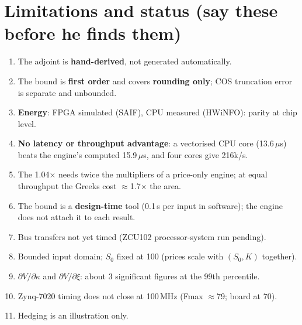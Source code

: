\documentclass[11pt,a4paper]{article}
\begin{document}
\section{Limitations and status (say these before he finds them)}
\begin{enumerate}
\item The adjoint is \textbf{hand-derived}, not generated automatically.
\item The bound is \textbf{first order} and covers \textbf{rounding only}; COS truncation error is separate and unbounded.
\item \textbf{Energy}: FPGA simulated (SAIF), CPU measured (HWiNFO): parity at chip level.
\item \textbf{No latency or throughput advantage}: a vectorised CPU core (13.6\,$\mu$s) beats the engine's computed 15.9\,$\mu$s, and four cores give 216k/s.
\item The 1.04$\times$ needs twice the multipliers of a price-only engine; at equal throughput the Greeks cost $\approx$1.7$\times$ the area.
\item The bound is a \textbf{design-time} tool (0.1\,s per input in software); the engine does not attach it to each result.
\item Bus transfers not yet timed (ZCU102 processor-system run pending).
\item Bounded input domain; $S_0$ fixed at 100 (prices scale with $(S_0,K)$ together).
\item $\partial V/\partial\kappa$ and $\partial V/\partial\xi$: about 3 significant figures at the 99th percentile.
\item Zynq-7020 timing does not close at 100\,MHz (Fmax $\approx$79; board at 70).
\item Hedging is an illustration only.
\end{enumerate}

\end{document}
